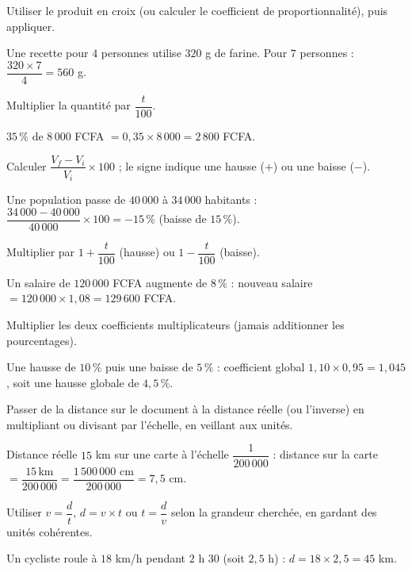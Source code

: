 Utiliser le produit en croix (ou calculer le coefficient de proportionnalité), puis
appliquer.
\begin{exemple}
Une recette pour $4$ personnes utilise $320$ g de farine. Pour $7$ personnes :
$\dfrac{320\times7}4=560$ g.
\end{exemple}

Multiplier la quantité par $\dfrac t{100}$.
\begin{exemple}
$35\,\%$ de $8\,000$ FCFA $=0{,}35\times8\,000=2\,800$ FCFA.
\end{exemple}

Calculer $\dfrac{V_f-V_i}{V_i}\times100$ ; le signe indique une hausse ($+$) ou une baisse
($-$).
\begin{exemple}
Une population passe de $40\,000$ à $34\,000$ habitants :
$\dfrac{34\,000-40\,000}{40\,000}\times100=-15\,\%$ (baisse de $15\,\%$).
\end{exemple}

Multiplier par $1+\dfrac t{100}$ (hausse) ou $1-\dfrac t{100}$ (baisse).
\begin{exemple}
Un salaire de $120\,000$ FCFA augmente de $8\,\%$ : nouveau salaire
$=120\,000\times1{,}08=129\,600$ FCFA.
\end{exemple}

Multiplier les deux coefficients multiplicateurs (jamais additionner les pourcentages).
\begin{exemple}
Une hausse de $10\,\%$ puis une baisse de $5\,\%$ : coefficient global
$1{,}10\times0{,}95=1{,}045$, soit une hausse globale de $4{,}5\,\%$.
\end{exemple}

Passer de la distance sur le document à la distance réelle (ou l'inverse) en multipliant ou
divisant par l'échelle, en veillant aux unités.
\begin{exemple}
Distance réelle $15$ km sur une carte à l'échelle $\dfrac1{200\,000}$ : distance sur la
carte $=\dfrac{15\,\text{km}}{200\,000}=\dfrac{1\,500\,000\text{ cm}}{200\,000}=7{,}5$ cm.
\end{exemple}

Utiliser $v=\dfrac dt$, $d=v\times t$ ou $t=\dfrac dv$ selon la grandeur cherchée, en gardant
des unités cohérentes.
\begin{exemple}
Un cycliste roule à $18$ km/h pendant $2$ h $30$ (soit $2{,}5$ h) :
$d=18\times2{,}5=45$ km.
\end{exemple}

